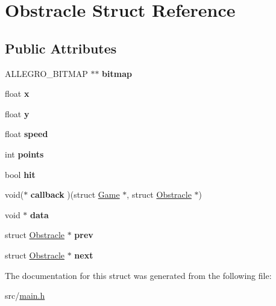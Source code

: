 \hypertarget{structObstracle}{\section{\-Obstracle \-Struct \-Reference}
\label{structObstracle}
}
\subsection*{\-Public \-Attributes}
\begin{DoxyCompactItemize}
\item 
\hypertarget{structObstracle_acf122606753c2f07480db806df8b93d5}{\-A\-L\-L\-E\-G\-R\-O\-\_\-\-B\-I\-T\-M\-A\-P $\ast$$\ast$ {\bfseries bitmap}}\label{structObstracle_acf122606753c2f07480db806df8b93d5}

\item 
\hypertarget{structObstracle_ac5867732615109fff3853fef8d92e80d}{float {\bfseries x}}\label{structObstracle_ac5867732615109fff3853fef8d92e80d}

\item 
\hypertarget{structObstracle_a6ae46ede239e472694e85fd676cfcd57}{float {\bfseries y}}\label{structObstracle_a6ae46ede239e472694e85fd676cfcd57}

\item 
\hypertarget{structObstracle_ac2caa1000b80250712881260b5dbab99}{float {\bfseries speed}}\label{structObstracle_ac2caa1000b80250712881260b5dbab99}

\item 
\hypertarget{structObstracle_a4932772ef9292e687c3c7368cd7d98d4}{int {\bfseries points}}\label{structObstracle_a4932772ef9292e687c3c7368cd7d98d4}

\item 
\hypertarget{structObstracle_aa737544997189b2c80fa613aaed87610}{bool {\bfseries hit}}\label{structObstracle_aa737544997189b2c80fa613aaed87610}

\item 
\hypertarget{structObstracle_ae3bffa1dcd01c82b0bc9def156589629}{void($\ast$ {\bfseries callback} )(struct \hyperlink{structGame}{\-Game} $\ast$, struct \hyperlink{structObstracle}{\-Obstracle} $\ast$)}\label{structObstracle_ae3bffa1dcd01c82b0bc9def156589629}

\item 
\hypertarget{structObstracle_ace6288d7b280e8464ed963ecf0e96259}{void $\ast$ {\bfseries data}}\label{structObstracle_ace6288d7b280e8464ed963ecf0e96259}

\item 
\hypertarget{structObstracle_a806bba53896fd1f67ac028bc11329d9e}{struct \hyperlink{structObstracle}{\-Obstracle} $\ast$ {\bfseries prev}}\label{structObstracle_a806bba53896fd1f67ac028bc11329d9e}

\item 
\hypertarget{structObstracle_a77a2abb2e97a2ac6d0537c7a3d838a1a}{struct \hyperlink{structObstracle}{\-Obstracle} $\ast$ {\bfseries next}}\label{structObstracle_a77a2abb2e97a2ac6d0537c7a3d838a1a}

\end{DoxyCompactItemize}


\-The documentation for this struct was generated from the following file\-:\begin{DoxyCompactItemize}
\item 
src/\hyperlink{main_8h}{main.\-h}\end{DoxyCompactItemize}
